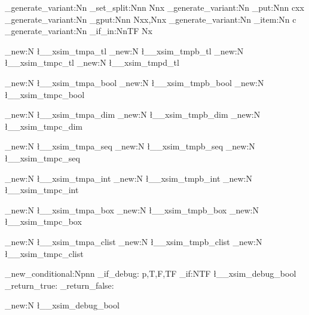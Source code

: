 % 
% 
% 
% 
% 

\cs_generate_variant:Nn \seq_set_split:Nnn {Nnx}
\cs_generate_variant:Nn \prop_put:Nnn      {cxx}
\cs_generate_variant:Nn \prop_gput:Nnn     {Nxx,Nnx}
\cs_generate_variant:Nn \prop_item:Nn      {c}
\cs_generate_variant:Nn \prop_if_in:NnTF   {Nx}

\tl_new:N    \l__xsim_tmpa_tl
\tl_new:N    \l__xsim_tmpb_tl
\tl_new:N    \l__xsim_tmpc_tl
\tl_new:N    \l__xsim_tmpd_tl

\bool_new:N  \l__xsim_tmpa_bool
\bool_new:N  \l__xsim_tmpb_bool
\bool_new:N  \l__xsim_tmpc_bool

\dim_new:N   \l__xsim_tmpa_dim
\dim_new:N   \l__xsim_tmpb_dim
\dim_new:N   \l__xsim_tmpc_dim

\seq_new:N   \l__xsim_tmpa_seq
\seq_new:N   \l__xsim_tmpb_seq
\seq_new:N   \l__xsim_tmpc_seq

\int_new:N   \l__xsim_tmpa_int
\int_new:N   \l__xsim_tmpb_int
\int_new:N   \l__xsim_tmpc_int

\box_new:N   \l__xsim_tmpa_box
\box_new:N   \l__xsim_tmpb_box
\box_new:N   \l__xsim_tmpc_box

\clist_new:N \l__xsim_tmpa_clist
\clist_new:N \l__xsim_tmpb_clist
\clist_new:N \l__xsim_tmpc_clist


\prg_new_conditional:Npnn \xsim_if_debug: {p,T,F,TF}
  {
    \bool_if:NTF \l__xsim_debug_bool
      { \prg_return_true: }
      { \prg_return_false: }
  }

\bool_new:N \l__xsim_debug_bool
  
